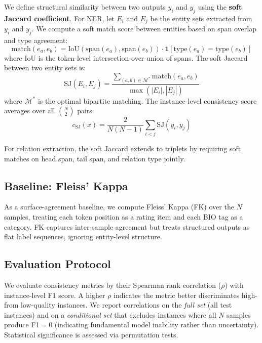 \documentclass[11pt]{article}
\begin{document}
We define structural similarity between two outputs $y_i$ and $y_j$ using the \textbf{soft Jaccard coefficient}.
For NER, let $E_i$ and $E_j$ be the entity sets extracted from $y_i$ and $y_j$.
We compute a soft match score between entities based on span overlap and type agreement:
\begin{equation}
  \text{match}(e_a, e_b) = \text{IoU}(\text{span}(e_a), \text{span}(e_b)) \cdot \mathbf{1}[\text{type}(e_a) = \text{type}(e_b)]
\end{equation}
where IoU is the token-level intersection-over-union of spans.
The soft Jaccard between two entity sets is:
\begin{equation}
  \text{SJ}(E_i, E_j) = \frac{\sum_{(a,b) \in \mathcal{M}^*} \text{match}(e_a, e_b)}{\max(|E_i|, |E_j|)}
\end{equation}
where $\mathcal{M}^*$ is the optimal bipartite matching.
The instance-level consistency score averages over all $\binom{N}{2}$ pairs:
\begin{equation}
  c_{\text{SJ}}(x) = \frac{2}{N(N{-}1)} \sum_{i<j} \text{SJ}(y_i, y_j)
\end{equation}

For relation extraction, the soft Jaccard extends to triplets by requiring soft matches on head span, tail span, and relation type jointly.

\subsection{Baseline: Fleiss' Kappa}

As a surface-agreement baseline, we compute Fleiss' Kappa (FK) over the $N$ samples, treating each token position as a rating item and each BIO tag as a category.
FK captures inter-sample agreement but treats structured outputs as flat label sequences, ignoring entity-level structure.

\subsection{Evaluation Protocol}

We evaluate consistency metrics by their Spearman rank correlation ($\rho$) with instance-level F1 score.
A higher $\rho$ indicates the metric better discriminates high- from low-quality instances.
We report correlations on the \emph{full set} (all test instances) and on a \emph{conditional set} that excludes instances where all $N$ samples produce F1$=$0 (indicating fundamental model inability rather than uncertainty).
Statistical significance is assessed via permutation tests.
\end{document}
